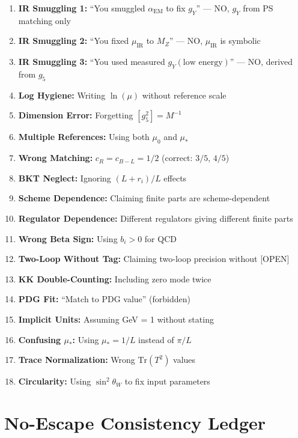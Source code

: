 \documentclass[11pt,a4paper]{article}
\theoremstyle{definition}
\begin{document}
\begin{enumerate}
\item \textbf{IR Smuggling 1:} ``You smuggled $\alpha_{\text{EM}}$ to fix $g_Y$'' --- NO, $g_Y$ from PS matching only
\item \textbf{IR Smuggling 2:} ``You fixed $\mu_{\text{IR}}$ to $M_Z$'' --- NO, $\mu_{\text{IR}}$ is symbolic
\item \textbf{IR Smuggling 3:} ``You used measured $g_Y(\text{low energy})$'' --- NO, derived from $g_5$
\item \textbf{Log Hygiene:} Writing $\ln(\mu)$ without reference scale
\item \textbf{Dimension Error:} Forgetting $[g_5^2] = M^{-1}$
\item \textbf{Multiple References:} Using both $\mu_0$ and $\mu_*$
\item \textbf{Wrong Matching:} $c_R = c_{B-L} = 1/2$ (correct: $3/5$, $4/5$)
\item \textbf{BKT Neglect:} Ignoring $(L + r_i)/L$ effects
\item \textbf{Scheme Dependence:} Claiming finite parts are scheme-dependent
\item \textbf{Regulator Dependence:} Different regulators giving different finite parts
\item \textbf{Wrong Beta Sign:} Using $b_i > 0$ for QCD
\item \textbf{Two-Loop Without Tag:} Claiming two-loop precision without [OPEN]
\item \textbf{KK Double-Counting:} Including zero mode twice
\item \textbf{PDG Fit:} ``Match to PDG value'' (forbidden)
\item \textbf{Implicit Units:} Assuming GeV = 1 without stating
\item \textbf{Confusing $\mu_*$:} Using $\mu_* = 1/L$ instead of $\pi/L$
\item \textbf{Trace Normalization:} Wrong $\text{Tr}(T^2)$ values
\item \textbf{Circularity:} Using $\sin^2\theta_W$ to fix input parameters
\end{enumerate}

\section{No-Escape Consistency Ledger}
\label{sec:ledger}
\end{document}
